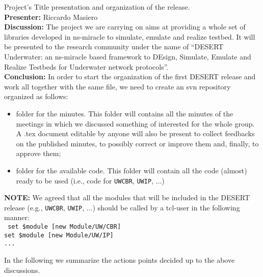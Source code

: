 \documentclass[11pt,journal,draftclsnofoot,onecolumn,twoside,letterpaper]{IEEEtran}
\theoremstyle{definition} \newtheorem{definition}[]{Definition}
\theoremstyle{theorem} \newtheorem{theorem}[]{Theorem}
\begin{document}
 Project's Title presentation and organization of the release.\\
{\bf Presenter:} Riccardo Masiero\\
{\bf Discussion:} The project we are carrying on aims at providing a whole set of libraries developed in ns-miracle to simulate, emulate and realize testbed. It will be presented to the research community under the name of ``DESERT Underwater: an ns-miracle based framework to DEsign, Simulate, Emulate and Realize Testbeds for Underwater network protocols''.\\  
{\bf Conclusion:}
In order to start the organization of the first DESERT release and work all together with the same file, we need to create an svn repository organized as follows:
\begin{itemize}
 \item folder for the minutes. This folder will contains all the minutes of the meetings in which we discussed something of interested for the whole group. A .tex document editable by anyone will also be present to collect feedbacks on the published minutes, to possibly correct or improve them and, finally, to approve them;
 \item folder for the available code. This folder will contain all the code (almost) ready to be used (i.e., code for {\tt UWCBR}, {\tt UWIP}, $\dots$)
\end{itemize}

{\bf NOTE:} We agreed that all the modules that will be included in the DESERT release (e.g., {\tt UWCBR}, {\tt UWIP}, $\dots$) should be called by a tcl-user in the following manner:\\
{\tt
set \$module [new Module/UW/CBR]\\ 
set \$module [new Module/UW/IP]\\
...\\
}


In the following we summarize the actions points decided up to the above discussions. 
\end{document}
